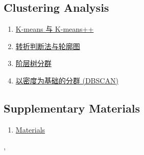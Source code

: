 \documentclass[11pt]{article}
\renewcommand{\today}{\shortmonthname[\the\month] \the \day,  \the\year}
\begin{document}
\subsection*{Clustering Analysis}

\vspace{-0.25cm}

\begin{multicols}{2}
	\begin{enumerate}
		\item \href{https://mp.weixin.qq.com/s/3wPnev_4INVpfupuBavuig}{K-means 与 K-means++}	%
		\item \href{https://mp.weixin.qq.com/s/aTIxS-_nuunjVbLO59y4PA}{转折判断法与轮廓图}	%
		\item \href{https://mp.weixin.qq.com/s/FtsA9Jbmq3MuHhz2sRBKzQ}{阶层树分群}	%
		\item \href{https://mp.weixin.qq.com/s/_guzPqQbCgoFTkwzJug0eA}{以密度为基础的分群 (DBSCAN)}	%
	\end{enumerate}
\end{multicols}

\subsection*{Supplementary Materials}

\vspace{-0.25cm}

\begin{enumerate}
	\item \href{url}{Materials}
\end{enumerate}




%
\begin{flushright}
	\tiny \today 
\end{flushright}
\end{document}
